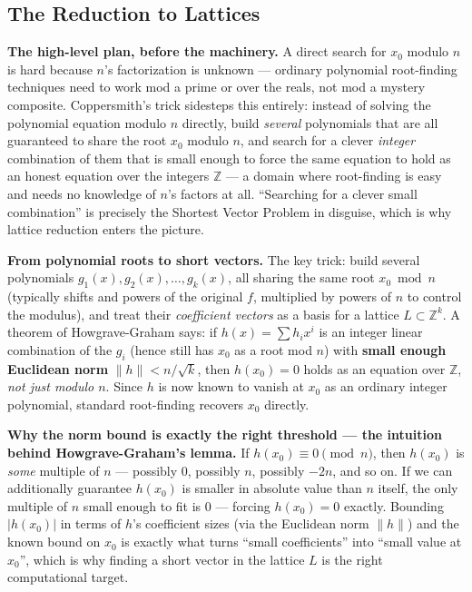 \subsection{The Reduction to Lattices}

\medskip\noindent\textbf{The high-level plan, before the machinery.} A direct search for $x_0$ modulo $n$ is hard because $n$'s factorization is unknown — ordinary polynomial root-finding techniques need to work mod a prime or over the reals, not mod a mystery composite. Coppersmith's trick sidesteps this entirely: instead of solving the polynomial equation modulo $n$ directly, build \emph{several} polynomials that are all guaranteed to share the root $x_0$ modulo $n$, and search for a clever \emph{integer} combination of them that is small enough to force the same equation to hold as an honest equation over the integers $\mathbb{Z}$ — a domain where root-finding is easy and needs no knowledge of $n$'s factors at all. ``Searching for a clever small combination'' is precisely the Shortest Vector Problem in disguise, which is why lattice reduction enters the picture.

\medskip\noindent\textbf{From polynomial roots to short vectors.} The key trick: build several polynomials $g_1(x), g_2(x), \dots, g_k(x)$, all sharing the same root $x_0 \bmod n$ (typically shifts and powers of the original $f$, multiplied by powers of $n$ to control the modulus), and treat their \emph{coefficient vectors} as a basis for a lattice $L \subset \mathbb{Z}^k$. A theorem of Howgrave-Graham says: if $h(x) = \sum h_i x^i$ is an integer linear combination of the $g_i$ (hence still has $x_0$ as a root mod $n$) with \textbf{small enough Euclidean norm} $\|h\| < n/\sqrt{k}$, then $h(x_0) = 0$ holds as an equation over $\mathbb{Z}$, \emph{not just modulo $n$}. Since $h$ is now known to vanish at $x_0$ as an ordinary integer polynomial, standard root-finding recovers $x_0$ directly.

\medskip\noindent\textbf{Why the norm bound is exactly the right threshold — the intuition behind Howgrave-Graham's lemma.} If $h(x_0)\equiv0\pmod n$, then $h(x_0)$ is \emph{some} multiple of $n$ — possibly $0$, possibly $n$, possibly $-2n$, and so on. If we can additionally guarantee $h(x_0)$ is smaller in absolute value than $n$ itself, the only multiple of $n$ small enough to fit is $0$ — forcing $h(x_0)=0$ exactly. Bounding $|h(x_0)|$ in terms of $h$'s coefficient sizes (via the Euclidean norm $\|h\|$) and the known bound on $x_0$ is exactly what turns ``small coefficients'' into ``small value at $x_0$'', which is why finding a short vector in the lattice $L$ is the right computational target.

